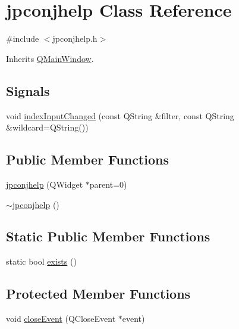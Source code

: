 \hypertarget{classjpconjhelp}{}\section{jpconjhelp Class Reference}
\label{classjpconjhelp}


{\ttfamily \#include $<$jpconjhelp.\+h$>$}



Inherits \hyperlink{class_q_main_window}{Q\+Main\+Window}.

\subsection*{Signals}
\begin{DoxyCompactItemize}
\item 
void \hyperlink{classjpconjhelp_afc76c94940f36ebaeefb010fcd415f6d}{index\+Input\+Changed} (const Q\+String \&filter, const Q\+String \&wildcard=Q\+String())
\end{DoxyCompactItemize}
\subsection*{Public Member Functions}
\begin{DoxyCompactItemize}
\item 
\hyperlink{classjpconjhelp_a00e909486d8b701933d611a472c3ea2e}{jpconjhelp} (Q\+Widget $\ast$parent=0)
\item 
\hyperlink{classjpconjhelp_afc8665a488b5df911a40d4f0a97f9c10}{$\sim$jpconjhelp} ()
\end{DoxyCompactItemize}
\subsection*{Static Public Member Functions}
\begin{DoxyCompactItemize}
\item 
static bool \hyperlink{classjpconjhelp_a1308a27ae2c993f6ac4345e422f418fa}{exists} ()
\end{DoxyCompactItemize}
\subsection*{Protected Member Functions}
\begin{DoxyCompactItemize}
\item 
void \hyperlink{classjpconjhelp_a7e7b64aed6fc35e15194e8182b46298e}{close\+Event} (Q\+Close\+Event $\ast$event)
\end{DoxyCompactItemize}


